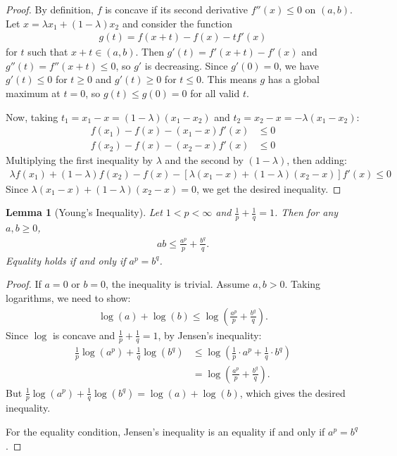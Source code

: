 \documentclass[11pt,reqno]{amsart}
\newtheorem{lemma}[theorem]{Lemma}
\theoremstyle{definition}
\theoremstyle{remark}
\begin{document}
\begin{proof}
	By definition, $f$ is concave if its second derivative $f''(x) \leq 0$ on $(a,b)$. Let $x = \lambda x_1 + (1-\lambda) x_2$ and consider the function
	\begin{align*}
		g(t) = f(x + t) - f(x) - tf'(x)
	\end{align*}
	for $t$ such that $x + t \in (a,b)$. Then $g'(t) = f'(x + t) - f'(x)$ and $g''(t) = f''(x + t) \leq 0$, so $g'$ is decreasing. Since $g'(0) = 0$, we have $g'(t) \leq 0$ for $t \geq 0$ and $g'(t) \geq 0$ for $t \leq 0$. This means $g$ has a global maximum at $t = 0$, so $g(t) \leq g(0) = 0$ for all valid $t$.

	Now, taking $t_1 = x_1 - x = (1-\lambda)(x_1 - x_2)$ and $t_2 = x_2 - x = -\lambda(x_1 - x_2)$:
	\begin{align*}
		f(x_1) - f(x) - (x_1 - x)f'(x) & \leq 0 \\
		f(x_2) - f(x) - (x_2 - x)f'(x) & \leq 0
	\end{align*}
	Multiplying the first inequality by $\lambda$ and the second by $(1-\lambda)$, then adding:
	\begin{align*}
		\lambda f(x_1) + (1-\lambda) f(x_2) - f(x) - [\lambda(x_1 - x) + (1-\lambda)(x_2 - x)]f'(x) \leq 0
	\end{align*}
	Since $\lambda(x_1 - x) + (1-\lambda)(x_2 - x) = 0$, we get the desired inequality.
\end{proof}

\begin{lemma}[Young's Inequality]
	Let $1 < p < \infty$ and $\frac{1}{p} + \frac{1}{q} = 1$. Then for any $a, b \geq 0$,
	\begin{align*}
		ab \leq \frac{a^p}{p} + \frac{b^q}{q}.
	\end{align*}
	Equality holds if and only if $a^p = b^q$.
\end{lemma}

\begin{proof}
	If $a = 0$ or $b = 0$, the inequality is trivial. Assume $a, b > 0$. Taking logarithms, we need to show:
	\begin{align*}
		\log(a) + \log(b) \leq \log\left(\frac{a^p}{p} + \frac{b^q}{q}\right).
	\end{align*}
	Since $\log$ is concave and $\frac{1}{p} + \frac{1}{q} = 1$, by Jensen's inequality:
	\begin{align*}
		\frac{1}{p}\log(a^p) + \frac{1}{q}\log(b^q) & \leq \log\left(\frac{1}{p} \cdot a^p + \frac{1}{q} \cdot b^q\right) \\
		                                            & = \log\left(\frac{a^p}{p} + \frac{b^q}{q}\right).
	\end{align*}
	But $\frac{1}{p}\log(a^p) + \frac{1}{q}\log(b^q) = \log(a) + \log(b)$, which gives the desired inequality.

	For the equality condition, Jensen's inequality is an equality if and only if $a^p = b^q$.
\end{proof}
\end{document}

